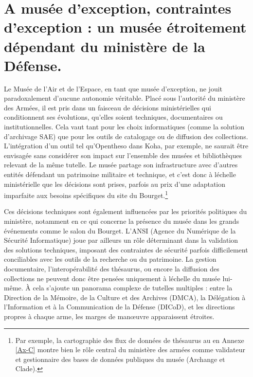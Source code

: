 \section{\label{I-B-1}A musée d’exception, contraintes d’exception : un musée étroitement dépendant du ministère de la Défense. }

Le Musée de l’Air et de l’Espace, en tant que musée d’exception, ne jouit paradoxalement d’aucune autonomie véritable. Placé sous l’autorité du ministère des Armées, il est pris dans un faisceau de décisions ministérielles qui conditionnent ses évolutions, qu’elles soient techniques, documentaires ou institutionnelles. Cela vaut tant pour les choix informatiques (comme la solution d’archivage SAE) que pour les outils de catalogage ou de diffusion des collections. L’intégration d’un outil tel qu’Opentheso dans Koha, par exemple, ne saurait être envisagée sans considérer son impact sur l’ensemble des musées et bibliothèques relevant de la même tutelle. Le musée partage son infrastructure avec d'autres entités défendant un patrimoine militaire et technique, et c’est donc à léchelle ministérielle que les décisions sont prises, parfois au prix d’une adaptation imparfaite aux besoins spécifiques du site du Bourget.\footnote{Par exemple, la cartographie des flux de données de thésaurus au \mae en Annexe \ref{Ax-C} montre bien le rôle central du ministère des armées comme validateur et gestionnaire des bases de données publiques du musée (Archange et Clade).}

Ces décisions techniques sont également influencées par les priorités politiques du ministère, notamment en ce qui concerne la présence du musée dans les grands événements comme le salon du Bourget. L’ANSI (Agence du Numérique de la Sécurité Informatique) joue par ailleurs un rôle déterminant dans la validation des solutions techniques, imposant des contraintes de sécurité parfois difficilement conciliables avec les outils de la recherche ou du patrimoine. La gestion documentaire, l’interopérabilité des thésaurus, ou encore la diffusion des collections ne peuvent donc être pensées uniquement à léchelle du musée lui-même. À cela s’ajoute un panorama complexe de tutelles multiples : entre la Direction de la Mémoire, de la Culture et des Archives (DMCA), la Délégation à l’Information et à la Communication de la Défense (DICoD), et les directions propres à chaque arme, les marges de manœuvre apparaissent étroites.

